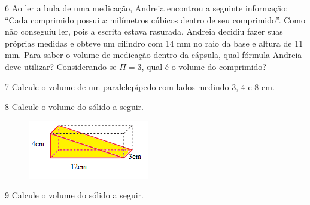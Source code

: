 \num{6} Ao ler a bula de uma medicação, Andreia encontrou a seguinte
informação: ``Cada comprimido possui $x$ milímetros cúbicos dentro de seu comprimido''. Como
não conseguiu ler, pois a escrita estava rasurada, Andreia decidiu fazer
suas próprias medidas e obteve um cilindro com 14 mm no raio da base e altura de 11 mm.
Para saber o volume de medicação dentro da cápsula, qual fórmula Andreia deve utilizar?
Considerando-se $\Pi = 3$, qual é o volume do comprimido?







\num{7} Calcule o volume de um paralelepípedo com lados medindo
3, 4 e 8 cm.





\num{8} Calcule o volume do sólido a seguir.

\begin{figure}[H]
\centering\includegraphics[width=2.08333in,height=1in]{./imgSAEB_8_MAT/media/image52.png}
\end{figure}




\num{9} Calcule o volume do sólido a seguir.

